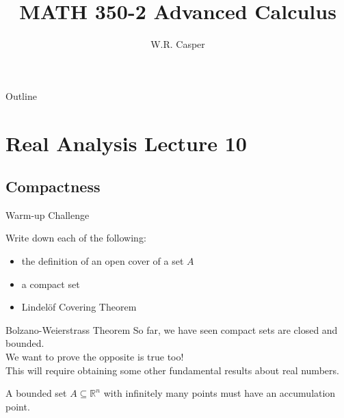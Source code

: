 \documentclass{beamer}
\title{MATH 350-2 Advanced Calculus}
\subtitle
{} %
\author[W.R. Casper] %
{W.R. Casper}
\institute[California State University Fullerton] %
{
  Department of Mathematics\\
  California State University Fullerton}
\begin{document}
\begin{frame}
  \titlepage
\end{frame}

\begin{frame}{Outline}
  \tableofcontents
\end{frame}



\section{Real Analysis Lecture 10}

\subsection{Compactness}

\begin{frame}{Warm-up Challenge}
\begin{prob}
Write down each of the following:
\begin{itemize}
\item the definition of an open cover of a set $A$
\pause
\item a compact set
\pause
\item Lindel\"of Covering Theorem
\end{itemize}
\end{prob}
\end{frame}

\begin{frame}{Bolzano-Weierstrass Theorem}
So far, we have seen compact sets are closed and bounded.\\
\pause
We want to prove the opposite is true too!\\
\pause
This will require obtaining some other fundamental results about real numbers.
\pause
\begin{thm}
A bounded set $A\subseteq \mathbb{R}^n$ with infinitely many points must have an accumulation point.
\end{thm}
\end{frame}
\end{document}

